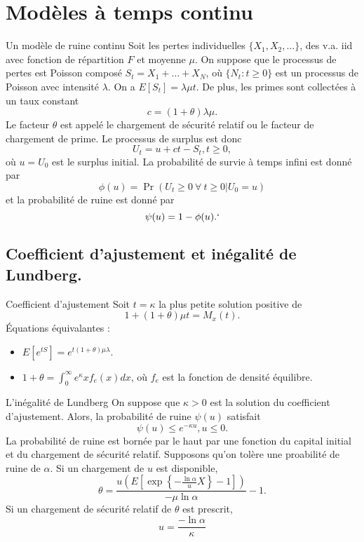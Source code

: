 \section{Modèles à temps continu}

\begin{definition}{Un modèle de ruine continu}{}
	Soit les pertes individuelles $\{X_1, X_2, \dots\}$, des v.a. iid avec fonction de répartition $F$ et moyenne $\mu$. On suppose que le processus de pertes est Poisson composé $S_t = X_1 + \dots + X_N$, où $\{N_t : t \geq 0\}$ est un processus de Poisson avec intensité $\lambda$. On a $E[S_t] = \lambda \mu t$. De plus, les primes sont collectées à un taux constant
	$$c = (1 + \theta)\lambda \mu.$$
	Le facteur $\theta$ est appelé le chargement de sécurité relatif ou le facteur de chargement de prime. Le processus de surplus est donc
	$$U_t = u + ct - S_t, t\geq 0,$$
	où $u = U_0$ est le surplus initial. 
	La probabilité de survie à temps infini est donné par 
	$$\phi(u) = \Pr(U_t \geq 0 ~\forall~ t \geq 0 \vert U_0 = u)$$
	et la probabilité de ruine est donné par $$\psi(u) = 1 - \phi(u).`$$
\end{definition}

\subsection{Coefficient d'ajustement et inégalité de Lundberg.}

\begin{definition}{Coefficient d'ajustement}{}
	Soit $t = \kappa$ la plus petite solution positive de 
	$$1 + (1 + \theta)\mu t = M_x(t).$$
	Équations équivalantes : 
	\begin{itemize}
		\item $\displaystyle E\left[e^{tS}\right] = e^{t(1 + \theta)\mu \lambda}.$
		\item $\displaystyle 1 + \theta = \int_{0}^{\infty} e^\kappa x f_{e}(x)dx$, où $f_e$ est la fonction de densité équilibre. 
	\end{itemize}
\end{definition}

\begin{proposition}{L'inégalité de Lundberg}{}
	On suppose que $\kappa > 0$ est la solution du coefficient d'ajustement. Alors, la probabilité de ruine $\psi(u)$ satisfait
	$$\psi(u) \leq e^{-\kappa u}, u \leq 0.$$
	\tcblower
	La probabilité de ruine est bornée par le haut par une fonction du capital initial et du chargement de sécurité relatif. Supposons qu'on tolère une proabilité de ruine de $\alpha$. Si un chargement de $u$ est disponible, 
	$$\theta = \frac{u \left( E \left[\exp\left\{-\frac{\ln \alpha}{u} X\right\} - 1\right]\right)}{-\mu \ln \alpha} - 1.$$
	Si un chargement de sécurité relatif de $\theta$ est prescrit, $$u = \frac{-\ln \alpha}{\kappa}$$
\end{proposition}

